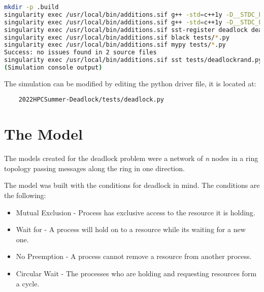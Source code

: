 \documentclass{article}
\begin{document}
\begin{lstlisting}[language=bash, frame=none]
mkdir -p .build
singularity exec /usr/local/bin/additions.sif g++ -std=c++1y -D__STDC_FORMAT_MACROS -fPIC -DHAVE_CONFIG_H -I/opt/SST/11.1.0/include -MMD -c node.cc -o .build/node.o
singularity exec /usr/local/bin/additions.sif g++ -std=c++1y -D__STDC_FORMAT_MACROS -fPIC -DHAVE_CONFIG_H -I/opt/SST/11.1.0/include -shared -fno-common -Wl,-undefined -Wl,dynamic_lookup -o libdeadlock.so .build/node.o
singularity exec /usr/local/bin/additions.sif sst-register deadlock deadlock_LIBDIR=/home/{USER}/sst-work/2022HPCSummer-Deadlock/deadlock
singularity exec /usr/local/bin/additions.sif black tests/*.py
singularity exec /usr/local/bin/additions.sif mypy tests/*.py
Success: no issues found in 2 source files
singularity exec /usr/local/bin/additions.sif sst tests/deadlockrand.py
(Simulation console output)
\end{lstlisting}

\noindent The simulation can be modified by editing the python driver file, it is located at:

\begin{verbatim}
	2022HPCSummer-Deadlock/tests/deadlock.py
\end{verbatim}

\section{The Model}
\label{sst_model}
The models created for the deadlock problem were a network of \textit{n} nodes in a ring topology passing messages along the ring in one direction.

The model was built with the conditions for deadlock in mind. The conditions are the following\cite[p. 70]{1971_Coffman}:

\begin{itemize}
	\label{list:conditions}
	\item Mutual Exclusion - Process has exclusive access to the resource it is holding.
	\item Wait for - A process will hold on to a resource while its waiting for a new one.
	\item No Preemption - A process cannot remove a resource from another process.
	\item Circular Wait - The processes who are holding and requesting resources form a cycle. \newline
\end{itemize}
\end{document}
